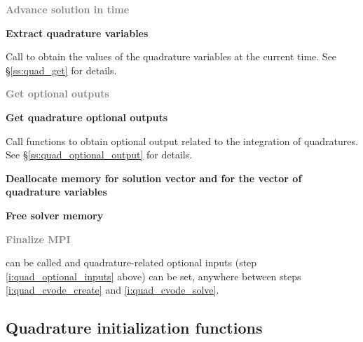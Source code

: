\begin{Steps}
\item\label{i:quad_cvode_solve}
  \textcolor{gray}{\bf Advance solution in time}

\item
  {\bf Extract quadrature variables}

  Call  to obtain the values of the quadrature variables at
  the current time. See \S\ref{ss:quad_get} for details.

\item
  \textcolor{gray}{\bf Get optional outputs}

\item
  {\bf Get quadrature optional outputs}

  Call  functions to obtain optional output related to
  the integration of quadratures.
  See \S\ref{ss:quad_optional_output} for details.

\item
  {\bf Deallocate memory for solution vector and for the vector of quadrature variables}
  
\item
  {\bf Free solver memory}

\item 
  \textcolor{gray}{\bf {\p} Finalize MPI}
  
\end{Steps}
 can be called and quadrature-related optional inputs 
(step \ref{i:quad_optional_inputs} above) can be set, anywhere between steps 
\ref{i:quad_cvode_create} and \ref{i:quad_cvode_solve}.


\subsection{Quadrature initialization functions}\label{ss:quad_malloc}

